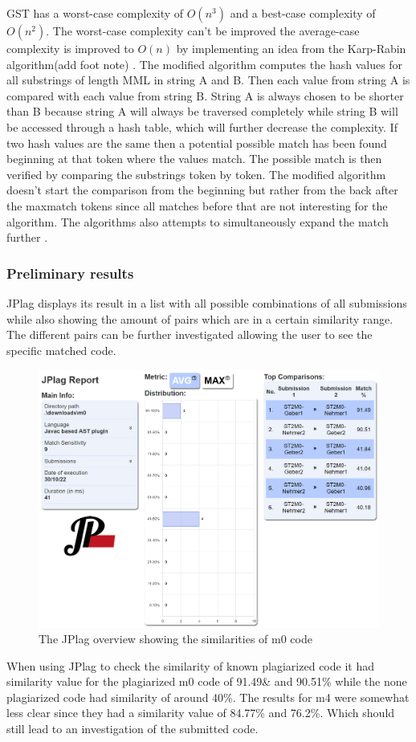 \documentclass[a4paper, 11pt]{article}
\renewcommand{\\}{\vspace*{0.5\baselineskip} \newline}
\begin{document}
GST has a worst-case complexity of \(O(n^3)\)\autocite[p. 5]{GST} and a best-case complexity of \(O(n^2)\)\autocite[p. 14]{JPlagP}. The worst-case
complexity can't be improved the average-case complexity is improved to \(O(n)\) by implementing an idea from the Karp-Rabin algorithm(add foot note)
\autocite*[p. 14]{JPlagP}. The modified algorithm computes the hash values for all substrings of length MML in string A and B. Then each value from
string A is compared with each value from string B. String A is always chosen to be shorter than B because string A will always be traversed completely
while string B will be accessed through a hash table, which will further decrease the complexity. If two hash values are the same then a potential possible match has
been found beginning at that token where the values match. The possible match is then verified by comparing the substrings token by token. 
The modified algorithm doesn't start the comparison from the beginning but rather from the back after the maxmatch tokens since all matches before that
are not interesting for the algorithm. The algorithms also attempts to simultaneously expand the match further \autocite[p. 14]{JPlagP}.

\subsubsection{Preliminary results}

JPlag displays its result in a list with all possible combinations of all submissions while also showing the amount of pairs which are in a certain
similarity range. The different pairs can be further investigated allowing the user to see the specific matched code.

\begin{figure}[h]
	\centering
	\includegraphics[scale=0.3]{figs/JPlag/JPlag_Overview.png}
	\caption{The JPlag overview showing the similarities of m0 code}
\end{figure}
When using JPlag to check the similarity of known plagiarized code it had similarity value for the plagiarized m0 code of 91.49\& and 90.51\% while the
none plagiarized code had similarity of around 40\%.
The results for m4 were somewhat less clear since they had a similarity value of 84.77\% and 76.2\%. Which should still lead to an investigation
of the submitted code.
\end{document}

